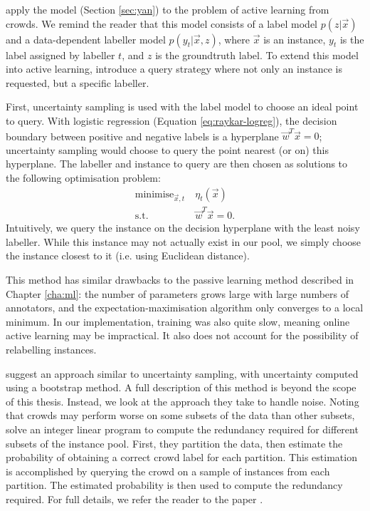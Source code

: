     \citet{yan11} apply the \citet{yan10} model (Section \ref{sec:yan}) to the
    problem of active learning from crowds. We remind the reader that this model
    consists of a label model $p(z | \vec x)$ and a data-dependent labeller
    model $p(y_t | \vec x, z)$, where $\vec x$ is an instance, $y_t$ is the
    label assigned by labeller $t$, and $z$ is the groundtruth label. To extend
    this model into active learning, \citeauthor{yan11} introduce a query
    strategy where not only an instance is requested, but a specific labeller.

    First, uncertainty sampling is used with the label model to choose an ideal
    point to query. With logistic regression (Equation \ref{eq:raykar-logreg}),
    the decision boundary between positive and negative labels is a hyperplane
    $\vec w^T \vec x = 0$; uncertainty sampling would choose to query the point
    nearest (or on) this hyperplane. The labeller and instance to query are then
    chosen as solutions to the following optimisation problem:
    \begin{align*}
        \text{minimise}_{\vec x, t}\ & \eta_t(\vec x)\\
        \text{s.t. } & \vec w^T \vec x = 0.
    \end{align*}
    Intuitively, we query the instance on the decision hyperplane with the least
    noisy labeller. While this instance may not actually exist in our pool, we
    simply choose the instance closest to it (i.e. using Euclidean distance).

    This method has similar drawbacks to the \citeauthor{yan10} passive learning
    method described in Chapter \ref{cha:ml}: the number of parameters grows
    large with large numbers of annotators, and the expectation-maximisation
    algorithm only converges to a local minimum. In our implementation, training
    was also quite slow, meaning online active learning may be impractical. It
    also does not account for the possibility of relabelling instances.

    \citet{mozafari12} suggest an approach similar to uncertainty sampling, with
    uncertainty computed using a bootstrap method. A full description of this
    method is beyond the scope of this thesis. Instead, we look at the approach
    they take to handle noise. Noting that crowds may perform worse on some
    subsets of the data than other subsets, \citeauthor{mozafari12} solve an
    integer linear program to compute the redundancy required for different
    subsets of the instance pool. First, they partition the data, then estimate
    the probability of obtaining a correct crowd label for each partition. This
    estimation is accomplished by querying the crowd on a sample of instances
    from each partition. The estimated probability is then used to compute the
    redundancy required. For full details, we refer the reader to the paper
    \citep{mozafari12}.

